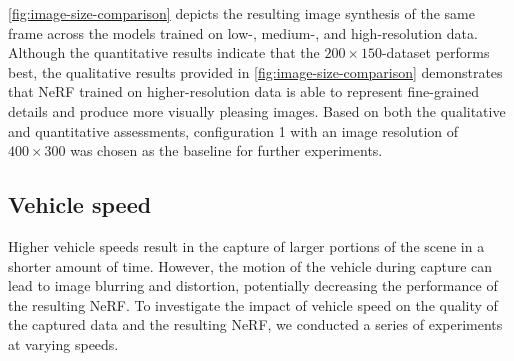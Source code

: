 \autoref{fig:image-size-comparison} depicts the resulting image synthesis of the same frame across the models trained on low-, medium-, and high-resolution data. Although the quantitative results indicate that the $200 \times 150$-dataset performs best, the qualitative results provided in \autoref{fig:image-size-comparison} demonstrates that NeRF trained on higher-resolution data is able to represent fine-grained details and produce more visually pleasing images. Based on both the qualitative and quantitative assessments, configuration 1 with an image resolution of $400 \times 300$ was chosen as the baseline for further experiments.










\subsection{Vehicle speed} \label{sec:exp-speed}
Higher vehicle speeds result in the capture of larger portions of the scene in a shorter amount of time. However, the motion of the vehicle during capture can lead to image blurring and distortion, potentially decreasing the performance of the resulting NeRF. To investigate the impact of vehicle speed on the quality of the captured data and the resulting NeRF, we conducted a series of experiments at varying speeds.




